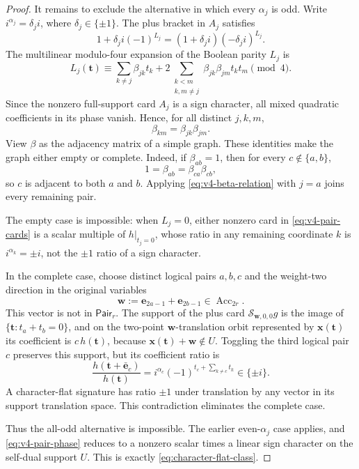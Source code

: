 \documentclass[11pt,letterpaper,onecolumn]{article}
\theoremstyle{plain}
\theoremstyle{definition}
\theoremstyle{remark}
\begin{document}
\begin{proof}
It remains to exclude the alternative in which every \(\alpha_j\) is odd.
Write \(i^{\alpha_j}=\delta_j i\), where \(\delta_j\in\{\pm1\}\).  The
plus bracket in \(A_j\) satisfies
\hypertarget{eq:v4-parity-bracket}{}
\begin{equation*}
 1+\delta_j i(-1)^{L_j}
 =(1+\delta_j i)(-\delta_j i)^{L_j}.
\end{equation*}
The multilinear modulo-four expansion of the Boolean parity \(L_j\) is
\hypertarget{eq:v4-parity-expansion}{}
\begin{equation*}
 L_j({\mathbf{t}})\equiv
 \sum_{k\ne j}\beta_{jk}t_k
 +2\sum_{\substack{k<m\\k,m\ne j}}
    \beta_{jk}\beta_{jm}t_kt_m
 \pmod4.
\end{equation*}
Since the nonzero full-support card \(A_j\) is a sign character, all mixed
quadratic coefficients in its phase vanish.  Hence, for all distinct
\(j,k,m\),
\begin{equation}
 \beta_{km}=\beta_{jk}\beta_{jm}.
 \label{eq:v4-beta-relation}
\end{equation}
View \(\beta\) as the adjacency matrix of a simple graph.  These identities
make the graph either empty or complete.  Indeed, if
\(\beta_{ab}=1\), then for every \(c\notin\{a,b\}\),
\[
 1=\beta_{ab}=\beta_{ca}\beta_{cb},
\]
so \(c\) is adjacent to both \(a\) and \(b\). Applying
\cref{eq:v4-beta-relation} with \(j=a\) joins every remaining pair.

The empty case is impossible: when \(L_j=0\), either nonzero card in
\cref{eq:v4-pair-cards} is a scalar multiple of \(h|_{t_j=0}\), whose
ratio in any remaining coordinate \(k\) is
\(i^{\alpha_k}=\pm i\), not the \(\pm1\) ratio of a sign character.

In the complete case, choose distinct logical pairs \(a,b,c\) and the
weight-two direction in the original variables
\[
 {\mathbf{w}}:={\mathbf{e}}_{2a-1}+{\mathbf{e}}_{2b-1}\in\operatorname{Acc}_{2r}.
\]
This vector is not in \(\mathsf{Pair}_r\).  The support of the plus card
\(\mathcal S_{{\mathbf{w}},0,0}g\) is the image of
\(\{{\mathbf{t}}:t_a+t_b=0\}\), and on the two-point \({\mathbf{w}}\)-translation orbit
represented by \({\mathbf x}({\mathbf{t}})\) its
coefficient is \(c\,h({\mathbf{t}})\), because \({\mathbf x}({\mathbf{t}})+{\mathbf{w}}\notin U\).  Toggling the
third logical pair \(c\) preserves this support, but its coefficient ratio
is
\[
 \frac{h({\mathbf{t}}+\bar {\mathbf{e}}_c)}{h({\mathbf{t}})}
 =i^{\alpha_c}(-1)^{t_c+\sum_{k\ne c}t_k}\in\{\pm i\}.
\]
A character-flat signature has ratio \(\pm1\) under translation by any vector in its
support translation space.  This contradiction eliminates the complete case.

Thus the all-odd alternative is impossible.  The earlier even-\(\alpha_j\)
case applies, and \cref{eq:v4-pair-phase} reduces to a nonzero scalar times
a linear sign character on the self-dual support \(U\).  This is exactly
\cref{eq:character-flat-class}.
\end{proof}
\end{document}
